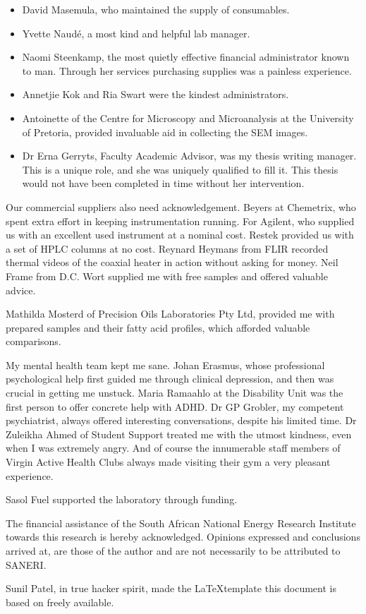 \documentclass[
11pt, %
english, %
singlespacing, %
headsepline, %
]{MastersDoctoralThesis} %
\begin{document}
\begin{acknowledgements}
\begin{itemize}
\item David Masemula, who maintained the supply of consumables.

\item Yvette Naudé, a most kind and helpful lab manager.

\item Naomi Steenkamp, the most quietly effective financial administrator known to
man. Through her services purchasing supplies was a painless experience.

\item Annetjie Kok and Ria Swart were the kindest administrators.

\item Antoinette of the Centre for Microscopy and Microanalysis at the
University of Pretoria, provided invaluable aid in collecting the SEM images.

\item Dr Erna Gerryts, Faculty Academic Advisor, was my thesis writing manager.
This is a unique role, and she was uniquely qualified to fill it. This thesis
would not have been completed in time without her intervention.

\end{itemize}

Our commercial suppliers also need acknowledgement. Beyers at Chemetrix, who
spent extra effort in keeping instrumentation running. For Agilent, who supplied
us with an excellent used instrument at a nominal cost. Restek provided us with a
set of HPLC columns at no cost. Reynard Heymans from FLIR recorded thermal
videos of the coaxial heater in action without asking for money. Neil Frame from
D.C. Wort supplied me with free samples and offered valuable advice.

Mathilda Mosterd of Precision Oils Laboratories Pty Ltd, provided me with
prepared samples and their fatty acid profiles, which afforded valuable
comparisons.

My mental health team kept me sane. Johan Erasmus, whose professional
psychological help first guided me through clinical depression, and then was
crucial in getting me unstuck. Maria Ramaahlo at the Disability Unit was the
first person to offer concrete help with ADHD. Dr GP Grobler, my competent
psychiatrist, always offered interesting conversations, despite his limited
time. Dr Zuleikha Ahmed of Student Support treated me with the utmost kindness,
even when I was extremely angry. And of course the innumerable staff members of
Virgin Active Health Clubs always made visiting their gym a very pleasant
experience.

Sasol Fuel supported the laboratory through funding.

The financial assistance of the South African National Energy Research Institute
towards this research is hereby acknowledged. Opinions expressed and conclusions
arrived at, are those of the author and are not necessarily to be attributed to
SANERI.

Sunil Patel, in true hacker spirit, made the \LaTeX template this document is
based on freely available.


\end{acknowledgements}
\end{document}
